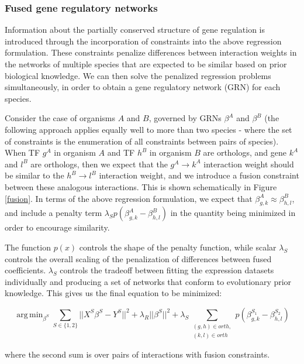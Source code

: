 \documentclass[11pt]{article}
\DeclareMathOperator*{\argmin}{arg\,min}
\begin{document}
\subsubsection{Fused gene regulatory networks}

Information about the partially conserved structure of gene regulation is introduced through the incorporation of constraints into the above regression formulation. These constraints penalize differences between interaction weights in the networks of multiple species that are expected to be similar based on prior biological knowledge. 
We can then solve the penalized regression problems simultaneously, in order to obtain a gene regulatory network (GRN) for each species.


Consider the case of organisms $A$ and $B$, governed by GRNs $\beta^A$ and $\beta^B$ (the following approach applies equally well to more than two species - where the set of constraints is the enumeration of all constraints between pairs of species). When TF $g^A$ in organism $A$ and TF $h^B$ in organism $B$ are orthologs, and gene $k^A$ and $l^B$ are orthologs, then we expect that the $g^A \rightarrow k^A$ interaction weight should be similar to the $h^B \rightarrow l^B$ interaction weight, and we introduce a fusion constraint between these analogous interactions. This is shown schematically in Figure \ref{fusion}. In terms of the above regression formulation, we expect that $\beta^A_{g,k} \approx \beta^B_{h,l}$, and include a penalty term $\lambda_Sp(\beta^A_{g,k} - \beta^B_{h,l})$ in the quantity being minimized in order to encourage similarity. 


The function $p(x)$ controls the shape of the penalty function, while scalar $\lambda_S$ controls the overall scaling of the penalization of differences between fused coefficients. $\lambda_S$ controls the tradeoff between fitting the expression datasets individually and producing a set of networks that conform to evolutionary prior knowledge. 
This gives us the final equation to be minimized: 

\begin{equation}
\argmin_{\beta^S} \displaystyle\sum_{S \in \{1, 2\}} \vert \vert X^S\beta^S - Y^S \vert \vert ^2 + \lambda_R \vert \vert \beta^S \vert \vert ^2 + \lambda_S \displaystyle \sum_{\substack{(g,h) \in orth,\\
 (k,l) \in orth}}p(\beta^{S_1}_{g,k} - \beta^{S_2}_{h,l})
\end{equation}

where the second sum is over pairs of interactions with fusion constraints. 
\end{document}
